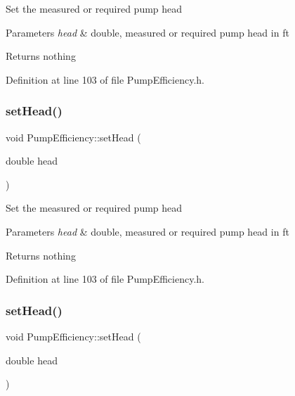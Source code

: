 Set the measured or required pump head


\begin{DoxyParams}{Parameters}
{\em head} & double, measured or required pump head in ft\\
\hline
\end{DoxyParams}
\begin{DoxyReturn}{Returns}
nothing 
\end{DoxyReturn}


Definition at line 103 of file Pump\+Efficiency.\+h.

\mbox{\label{class_pump_efficiency_addfa92d7c30598ecedcee8f7c47eed29}} 
\subsubsection{\texorpdfstring{set\+Head()}{setHead()}\hspace{0.1cm}{\footnotesize\ttfamily [2/3]}}
{\footnotesize\ttfamily void Pump\+Efficiency\+::set\+Head (\begin{DoxyParamCaption}\item[{double}]{head }\end{DoxyParamCaption})\hspace{0.3cm}{\ttfamily [inline]}}

Set the measured or required pump head


\begin{DoxyParams}{Parameters}
{\em head} & double, measured or required pump head in ft\\
\hline
\end{DoxyParams}
\begin{DoxyReturn}{Returns}
nothing 
\end{DoxyReturn}


Definition at line 103 of file Pump\+Efficiency.\+h.

\mbox{\label{class_pump_efficiency_addfa92d7c30598ecedcee8f7c47eed29}} 
\subsubsection{\texorpdfstring{set\+Head()}{setHead()}\hspace{0.1cm}{\footnotesize\ttfamily [3/3]}}
{\footnotesize\ttfamily void Pump\+Efficiency\+::set\+Head (\begin{DoxyParamCaption}\item[{double}]{head }\end{DoxyParamCaption})\hspace{0.3cm}{\ttfamily [inline]}}

